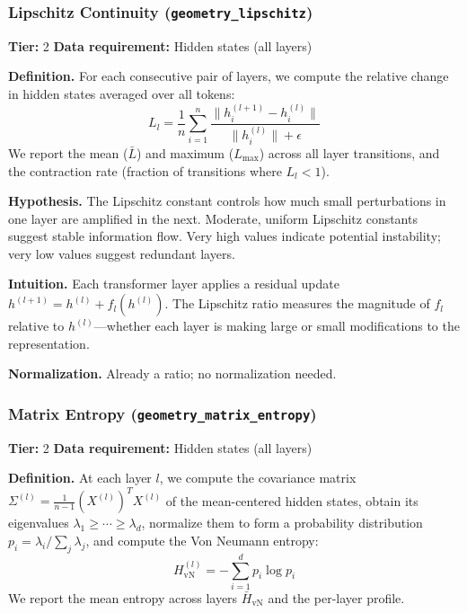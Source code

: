 \documentclass[preprint]{neurips_2025}
\begin{document}
\subsubsection{Lipschitz Continuity (\texttt{geometry\_lipschitz})}
\label{app:lipschitz}

\textbf{Tier:} 2 \quad \textbf{Data requirement:} Hidden states (all layers)

\textbf{Definition.}
For each consecutive pair of layers, we compute the relative change in hidden states averaged over all tokens:
\begin{equation}
  L_l = \frac{1}{n}\sum_{i=1}^{n} \frac{\|h_i^{(l+1)} - h_i^{(l)}\|}{\|h_i^{(l)}\| + \epsilon}
\end{equation}
We report the mean ($\bar{L}$) and maximum ($L_{\max}$) across all layer transitions, and the contraction rate (fraction of transitions where $L_l < 1$).

\textbf{Hypothesis.}
The Lipschitz constant controls how much small perturbations in one layer are amplified in the next. Moderate, uniform Lipschitz constants suggest stable information flow. Very high values indicate potential instability; very low values suggest redundant layers.

\textbf{Intuition.}
Each transformer layer applies a residual update $h^{(l+1)} = h^{(l)} + f_l(h^{(l)})$. The Lipschitz ratio measures the magnitude of $f_l$ relative to $h^{(l)}$---whether each layer is making large or small modifications to the representation.

\textbf{Normalization.} Already a ratio; no normalization needed.

\subsubsection{Matrix Entropy (\texttt{geometry\_matrix\_entropy})}
\label{app:matrix-entropy}

\textbf{Tier:} 2 \quad \textbf{Data requirement:} Hidden states (all layers)

\textbf{Definition.}
At each layer $l$, we compute the covariance matrix $\Sigma^{(l)} = \frac{1}{n-1}(X^{(l)})^T X^{(l)}$ of the mean-centered hidden states, obtain its eigenvalues $\lambda_1 \geq \cdots \geq \lambda_d$, normalize them to form a probability distribution $p_i = \lambda_i / \sum_j \lambda_j$, and compute the Von Neumann entropy:
\begin{equation}
  H_{\text{vN}}^{(l)} = -\sum_{i=1}^{d} p_i \log p_i
\end{equation}
We report the mean entropy across layers $\bar{H}_{\text{vN}}$ and the per-layer profile.
\end{document}
